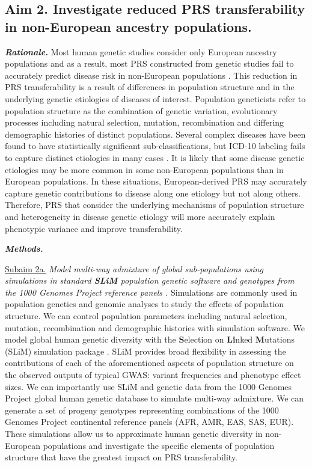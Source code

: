 \documentclass[11pt]{article}  %
\newlength\tindent
\renewcommand{\indent}{\hspace*{\tindent}}
\begin{document}
\subsection*{Aim 2. Investigate reduced PRS transferability in non-European ancestry populations.}

\indent \textbf{\textit{Rationale.}} Most human genetic studies consider only European ancestry populations and as a result, most PRS constructed from genetic studies fail to accurately predict disease risk in non-European populations \cite{wojcik_genetic_2019}. This reduction in PRS transferability is a result of differences in population structure and in the underlying genetic etiologies of diseases of interest. Population geneticists refer to population structure as the combination of genetic variation, evolutionary processes including natural selection, mutation, recombination and differing demographic histories of distinct populations. Several complex diseases have been found to have statistically significant sub-classifications, but ICD-10 labeling fails to capture distinct etiologies in many cases \cite{???}. It is likely that some disease genetic etiologies may be more common in some non-European populations than in European populations. In these situations, European-derived PRS may accurately capture genetic contributions to disease along one etiology but not along others. Therefore, PRS that consider the underlying mechanisms of population structure and heterogeneity in disease genetic etiology will more accurately explain phenotypic variance and improve transferability.         


\indent \textbf{\textit{Methods.}} 

\indent \underline{Subaim 2a.} \textit{Model multi-way admixture of global sub-populations using simulations in standard \textbf{SLiM} population genetic software \cite{haller_slim_2019} and genotypes from the 1000 Genomes Project reference panels \cite{noauthor_global_2015}.} Simulations are commonly used in population genetics and genomic analyses to study the effects of population structure. We can control population parameters including natural selection, mutation, recombination and demographic histories with simulation software. We model global human genetic diversity with the \textbf{S}election on \textbf{Li}nked \textbf{M}utations (SLiM) simulation package \cite{haller_slim_2019}. SLiM provides broad flexibility in assessing the contributions of each of the aforementioned aspects of population structure on the observed outputs of typical GWAS: variant frequencies and phenotype effect sizes. We can importantly use SLiM and genetic data from the 1000 Genomes Project \cite{noauthor_global_2015} global human genetic database to simulate multi-way admixture. We can generate a set of progeny genotypes representing combinations of the 1000 Genomes Project continental reference panels (AFR, AMR, EAS, SAS, EUR). These simulations allow us to approximate human genetic diversity in non-European populations and investigate the specific elements of population structure that have the greatest impact on PRS transferability.
\end{document}
